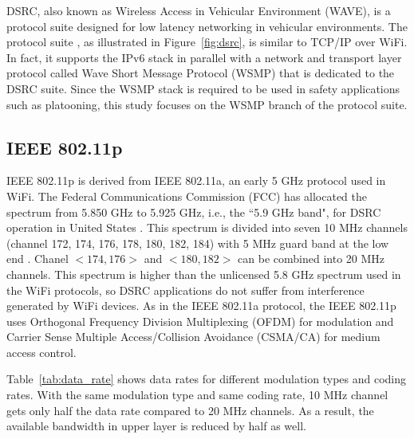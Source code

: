 \documentclass[12pt]{report}
\begin{document}
DSRC, also known as Wireless Access in Vehicular Environment (WAVE), is a protocol suite designed for low latency networking in vehicular environments. The protocol suite \cite{kenney2011}, as illustrated in Figure~\ref{fig:dsrc}, is similar to TCP/IP over WiFi. In fact, it supports the IPv6 stack in parallel with a network and transport layer protocol called Wave Short Message Protocol (WSMP) that is dedicated to the DSRC suite. Since the WSMP stack is required to be used in safety applications such as platooning, this study focuses on the WSMP branch of the protocol suite.

\subsection{IEEE 802.11p}
\label{sec:80211p}
IEEE 802.11p is derived from IEEE 802.11a, an early 5 GHz protocol used in WiFi. The Federal Communications Commission (FCC) has allocated the spectrum from 5.850 GHz to 5.925 GHz, i.e., the ``5.9 GHz band", for DSRC operation in United States \cite{fcc59allocation}. This spectrum is divided into seven 10 MHz channels (channel 172, 174, 176, 178, 180, 182, 184) with 5 MHz guard band at the low end \cite{kenney2011}. Chanel $<174, 176>$ and $<180, 182>$ can be combined into 20 MHz channels. This spectrum is higher than the unlicensed 5.8 GHz spectrum used in the WiFi protocols, so DSRC applications do not suffer from interference generated by WiFi devices. As in the IEEE 802.11a protocol, the IEEE 802.11p uses Orthogonal Frequency Division Multiplexing (OFDM) for modulation and Carrier Sense Multiple Access/Collision Avoidance (CSMA/CA) for medium access control.

Table~\ref{tab:data_rate} shows data rates \cite{kenney2011} for different modulation types and coding rates. With the same modulation type and same coding rate, 10 MHz channel gets only half the data rate compared to 20 MHz channels. As a result, the available bandwidth in upper layer is reduced by half as well.
\end{document}
